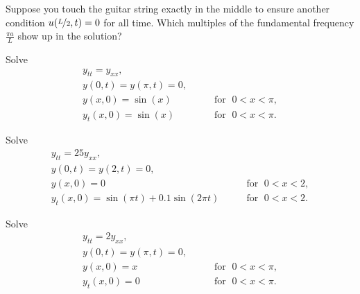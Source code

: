 \begin{exercise}
Suppose you touch the guitar string exactly in the middle to
ensure another condition $u(\nicefrac{L}{2},t) = 0$ for all time.
Which multiples of the fundamental frequency $\frac{\pi a}{L}$
show up in the solution?
\end{exercise}

\setcounter{exercise}{100}

\begin{exercise}
Solve
\begin{equation*}
\begin{array}{ll}
y_{tt} = y_{xx} , &  \\
y(0,t) = y(\pi,t) = 0 , &  \\
y(x,0) = \sin(x) & \qquad \text{for } \; 0 < x < \pi , \\
y_t(x,0) = \sin(x) & \qquad \text{for } \; 0 < x < \pi .
\end{array}
\end{equation*}
\end{exercise}

\begin{exercise}
Solve
\begin{equation*}
\begin{array}{ll}
y_{tt} = 25 y_{xx} , &  \\
y(0,t) = y(2,t) = 0 , &  \\
y(x,0) = 0 & \qquad \text{for } \; 0 < x < 2 , \\
y_t(x,0) = \sin(\pi t) + 0.1 \sin(2\pi t) & \qquad \text{for } \; 0 < x < 2 .
\end{array}
\end{equation*}
\end{exercise}

\begin{exercise}
Solve
\begin{equation*}
\begin{array}{ll}
y_{tt} = 2 y_{xx} , &  \\
y(0,t) = y(\pi,t) = 0 , &  \\
y(x,0) = x & \qquad \text{for } \; 0 < x < \pi , \\
y_t(x,0) = 0 & \qquad \text{for } \; 0 < x < \pi .
\end{array}
\end{equation*}
\end{exercise}
\exsol{%
$
y(x,t)
=
\sum\limits_{n=1}^\infty
\frac{2{(-1)}^{n+1}}{n}
\sin(nx)
\cos( n \sqrt{2}\,t ) 
$
}

